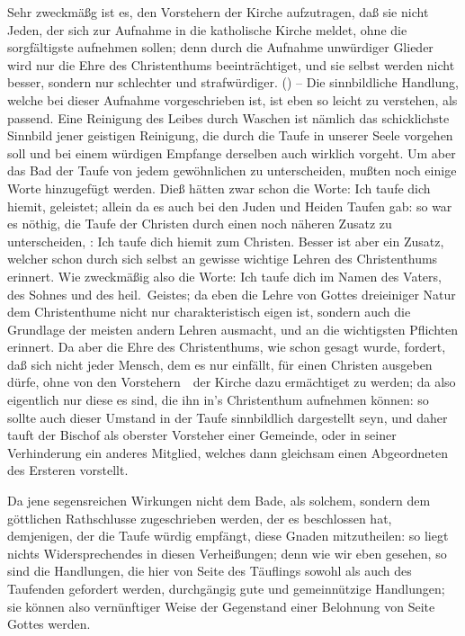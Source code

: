 \begin{aufza}
\item Sehr zweckmäßg ist es, den Vorstehern der Kirche aufzutragen, daß sie nicht Jeden, der sich zur Aufnahme in die katholische Kirche meldet, ohne die sorgfältigste  aufnehmen sollen; denn durch die Aufnahme unwürdiger Glieder wird nur die Ehre des Christenthums beeinträchtiget, und sie selbst werden nicht besser, sondern nur schlechter und strafwürdiger. () -- Die sinnbildliche Handlung, welche bei dieser Aufnahme vorgeschrieben ist, ist eben so leicht zu verstehen, als passend. Eine Reinigung des Leibes durch Waschen ist nämlich das schicklichste Sinnbild jener geistigen Reinigung, die durch die Taufe in unserer Seele vorgehen soll und bei einem würdigen Empfange derselben auch wirklich vorgeht. Um aber das Bad der Taufe von jedem gewöhnlichen zu unterscheiden, mußten noch einige Worte hinzugefügt werden. Dieß hätten zwar schon die Worte: Ich taufe dich hiemit, geleistet; allein da es auch bei den Juden und Heiden Taufen gab: so war es nöthig, die Taufe der Christen durch einen noch näheren Zusatz zu unterscheiden, \zB : Ich taufe dich hiemit zum Christen. Besser ist aber ein Zusatz, welcher schon durch sich selbst an gewisse wichtige Lehren des Christenthums erinnert. Wie zweckmäßig also die Worte: Ich taufe dich im Namen des Vaters, des Sohnes und des heil.\ Geistes; da eben die Lehre von Gottes dreieiniger Natur dem Christenthume nicht nur charakteristisch eigen ist, sondern auch die Grundlage der meisten andern Lehren ausmacht, und an die wichtigsten Pflichten erinnert. Da aber die Ehre des Christenthums, wie schon gesagt wurde, fordert, daß sich nicht jeder Mensch, dem es nur einfällt, für einen Christen ausgeben dürfe, ohne von den Vorstehern~\ der Kirche dazu ermächtiget zu werden; da also eigentlich nur diese es sind, die ihn in's Christenthum aufnehmen können: so sollte auch dieser Umstand in der Taufe sinnbildlich dargestellt seyn, und daher tauft der Bischof als oberster Vorsteher einer Gemeinde, oder in seiner Verhinderung ein anderes Mitglied, welches dann gleichsam einen Abgeordneten des Ersteren vorstellt.
\item Da jene segensreichen Wirkungen nicht dem Bade, als solchem, sondern dem göttlichen Rathschlusse zugeschrieben werden, der es beschlossen hat, demjenigen, der die Taufe würdig empfängt, diese Gnaden mitzutheilen: so liegt nichts Widersprechendes in diesen Verheißungen; denn wie wir eben gesehen, so sind die Handlungen, die hier von Seite des Täuflings sowohl als auch des Taufenden gefordert werden, durchgängig gute und gemeinnützige Handlungen; sie können also vernünftiger Weise der Gegenstand einer Belohnung von Seite Gottes werden.

\end{aufza}

